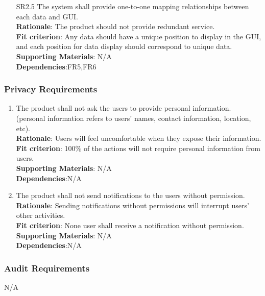\documentclass{article}
\begin{document}
\begin{enumerate}[SR2.1]
    \item[SR2.5] The system shall provide one-to-one
     mapping relationships between each data and GUI.\\
     \textbf{Rationale}: The product should not provide redundant service.  \\
     \textbf{Fit criterion}: Any data should have a unique position to display in the GUI, and each position for data display should correspond to unique data.\\
\textbf{Supporting Materials}: N/A\\
\textbf{Dependencies}:FR5,FR6\\

\end{enumerate}
\subsubsection{Privacy Requirements}
\begin{enumerate}[SR3.1]
\item The product shall not ask the users to provide personal 
information. (personal information refers to users' names, 
contact information, location, etc).\\
\textbf{Rationale}: Users will feel uncomfortable when they expose their information.\\
\textbf{Fit criterion}: 100\% of the actions will not require personal information from users.\\
\textbf{Supporting Materials}: N/A\\
\textbf{Dependencies}:N/A\\

    \item The product shall not send notifications to the users 
    without permission.\\
    \textbf{Rationale}: Sending notifications without permissions will
    interrupt users' other activities.\\
    \textbf{Fit criterion}: None user shall receive a notification without permission.\\
\textbf{Supporting Materials}: N/A\\
\textbf{Dependencies}:N/A\\

\end{enumerate}
\subsubsection{Audit Requirements}
 N/A
\end{document}
